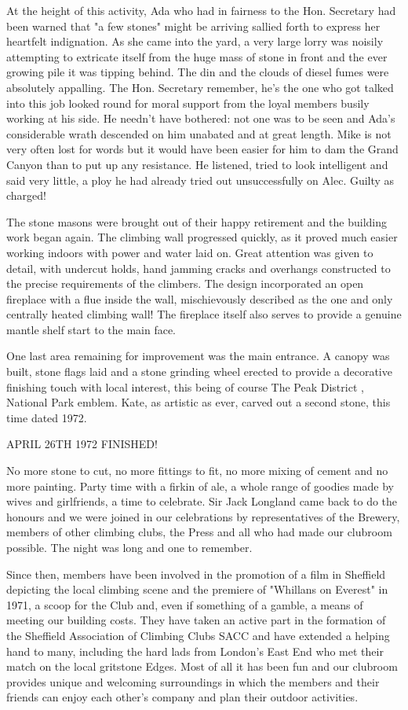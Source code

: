 \documentclass[a5paper,openany,font 10pt]{scrbook}
\begin{document}
At the height of this activity, Ada  who had in fairness to
the Hon. Secretary had been warned that "a few stones" might be
arriving  sallied forth to express her heartfelt indignation. As
she came into the yard, a very large lorry was noisily attempting
to extricate itself from the huge mass of stone in front and the
ever growing pile it was tipping behind. The  din and the clouds
of diesel fumes were absolutely appalling. The Hon. Secretary
 remember, he's the one who got talked into this job  looked
round for moral support from the loyal members busily working at
his side. He needn't have bothered: not one was to be seen and
Ada's considerable wrath descended on him unabated and at great
length. Mike is not very often lost for words but it would have
been easier for him to dam the Grand Canyon than to put up any
resistance. He listened, tried to look intelligent and said very
little, a ploy he had already tried out unsuccessfully on Alec.
Guilty as charged!

The stone masons were brought out of their happy retirement
and the building work began again. The climbing wall progressed
quickly, as it proved much easier working indoors with power and
water laid on.  Great attention was given to detail, with
undercut holds, hand jamming cracks and overhangs constructed to
the precise requirements of the climbers. The design incorporated
an open fireplace with a flue inside the wall, mischievously
described as the one and only centrally heated climbing wall! The
fireplace itself also serves to provide a genuine mantle shelf
start to the main face.

One last area remaining for improvement was the main
entrance. A canopy was built, stone flags laid and a stone
grinding wheel erected to provide a decorative finishing touch
with local interest, this being of course The Peak District ,
 National Park emblem. Kate, as artistic as ever, carved out a
second stone, this time dated 1972.

APRIL 26TH 1972   FINISHED!

No more stone to cut, no more fittings to fit, no more
mixing of cement and no more painting. Party time with a firkin
of ale, a whole range of goodies made by wives and girlfriends, a
time to celebrate. Sir Jack Longland came back to do the honours
and we were joined in our celebrations by representatives of the
Brewery, members of other climbing clubs, the Press and all who
had made our clubroom possible. The night was long and one to
remember.

Since then, members have been involved in the promotion of a
film in Sheffield depicting the local climbing scene and the
premiere of "Whillans on Everest" in 1971, a scoop for the Club
and, even if something of a gamble, a means of meeting our
building costs. They have taken an active part in the formation
of the Sheffield Association of Climbing Clubs  SACC  and have
extended a helping hand to many, including the hard lads from
London's East End who met their match on the local gritstone
Edges. Most of all it has been fun and our clubroom provides
unique and welcoming surroundings in which the members and their
friends can enjoy each other's company and plan their outdoor
activities.
\end{document}
